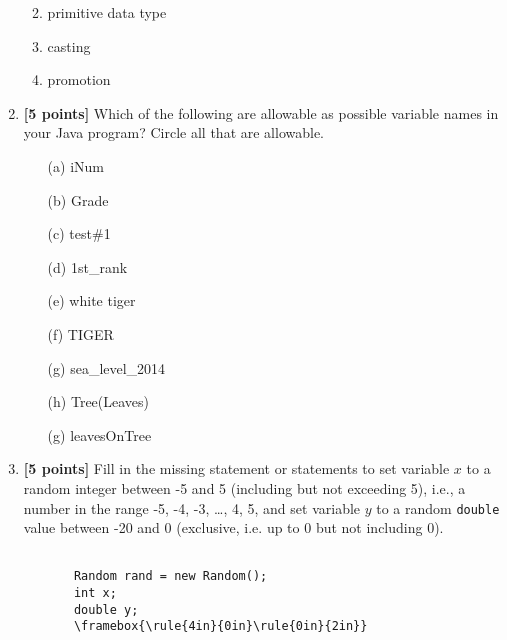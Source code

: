 \documentclass[11pt]{report}
\begin{document}
\begin{enumerate}
\begin{enumerate}
\bigskip
\bigskip
\bigskip
\item primitive data type

\bigskip
\bigskip
\bigskip

\item casting

\bigskip
\bigskip
\bigskip

\item promotion
\bigskip
\bigskip
\bigskip
\end{enumerate}

\item {\bf [5 points]}
Which of the following are allowable as possible variable names in your Java program? Circle all that are allowable.
\begin{itemize}
\item[(a)] iNum
\item[(b)] Grade
\item[(c)] test\#1
\item[(d)] 1st\_rank
\item[(e)] white tiger
\item[(f)] TIGER
\item[(g)] sea\_level\_2014
\item[(h)] Tree(Leaves)
\item[(g)] leavesOnTree
\end{itemize}
\bigskip

\item {\bf [5 points]}
Fill in the missing statement or statements to set 
variable $x$ to a random integer between -5
and 5 (including but not exceeding 5), i.e., a number in the range -5, -4, -3, \ldots , 4, 5,
and set variable $y$ to a random {\tt double} value between -20 and 0 (exclusive, i.e. up to 0 but not including 0).
\begin{Verbatim}[commandchars=\\\{\}]

       Random rand = new Random();
       int x;
       double y;
       \framebox{\rule{4in}{0in}\rule{0in}{2in}}
\end{Verbatim}

\newpage



\end{enumerate}
\end{document}

